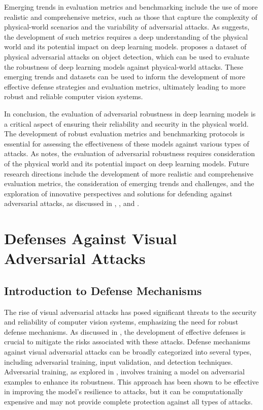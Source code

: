 \documentclass[11pt,a4paper]{article}
\begin{document}
Emerging trends in evaluation metrics and benchmarking include the use of more realistic and comprehensive metrics, such as those that capture the complexity of physical-world scenarios and the variability of adversarial attacks. As \cite{doi:10.1201/9781351251389-8} suggests, the development of such metrics requires a deep understanding of the physical world and its potential impact on deep learning models. \cite{doi:10.1007/978-3-030-58589-1_3} proposes a dataset of physical adversarial attacks on object detection, which can be used to evaluate the robustness of deep learning models against physical-world attacks. These emerging trends and datasets can be used to inform the development of more effective defense strategies and evaluation metrics, ultimately leading to more robust and reliable computer vision systems.

In conclusion, the evaluation of adversarial robustness in deep learning models is a critical aspect of ensuring their reliability and security in the physical world. The development of robust evaluation metrics and benchmarking protocols is essential for assessing the effectiveness of these models against various types of attacks. As \cite{arxiv:2104.02361} notes, the evaluation of adversarial robustness requires consideration of the physical world and its potential impact on deep learning models. Future research directions include the development of more realistic and comprehensive evaluation metrics, the consideration of emerging trends and challenges, and the exploration of innovative perspectives and solutions for defending against adversarial attacks, as discussed in \cite{doi:10.1109/iros51168.2021.9636638}, \cite{arxiv:2209.09502}, and \cite{doi:10.1109/eurosp53844.2022.00047}.


\section{Defenses Against Visual Adversarial Attacks}



\subsection{Introduction to Defense Mechanisms}


The rise of visual adversarial attacks has posed significant threats to the security and reliability of computer vision systems, emphasizing the need for robust defense mechanisms. As discussed in \cite{arxiv:1810.00069}, the development of effective defenses is crucial to mitigate the risks associated with these attacks. Defense mechanisms against visual adversarial attacks can be broadly categorized into several types, including adversarial training, input validation, and detection techniques. Adversarial training, as explored in \cite{arxiv:2102.01356}, involves training a model on adversarial examples to enhance its robustness. This approach has been shown to be effective in improving the model's resilience to attacks, but it can be computationally expensive and may not provide complete protection against all types of attacks.
\end{document}
